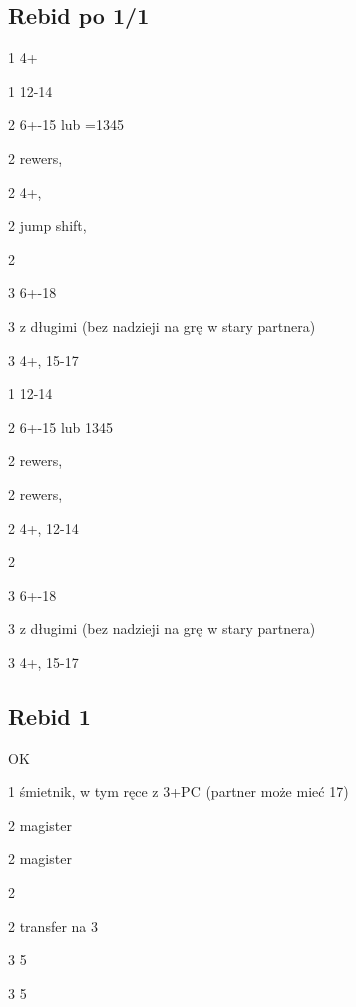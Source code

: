 \documentclass[12pt, a4paper]{article}
\begin{document}
\subsection*{Rebid po 1/1}

\sequence{{1\clubs}{1\hearts}}
\begin{options}[1]
    \item[1\spades] 4+\spades \nf
    \item[1\nt] 12-14 \bal
    \item[2\clubs] 6+-15 lub =1345 
    \item[2\diams] rewers, \fonce
    \item[2\hearts] 4+\hearts, \nf
    \item[2\spades] jump shift, \gf
    \item[2\nt] \gf
    \item[3\clubs] 6+-18 
    \item[3\diams] \gf z długimi \clubs (bez nadzieji na grę w stary partnera)  \vimp
    \item[3\hearts] 4+\hearts, 15-17 
\end{options}

\sequence{{1\clubs}{1\spades}}
\begin{options}[1]
    \item[1\nt] 12-14 \bal
    \item[2\clubs] 6+-15 lub 1345\clubs 
    \item[2\diams] rewers, \fonce
    \item[2\hearts] rewers, \fonce
    \item[2\spades] 4+\spades, 12-14
    \item[2\nt] \gf
    \item[3\clubs] 6+-18 
    \item[3\diams] \gf z długimi \clubs (bez nadzieji na grę w stary partnera) \vimp
    \item[3\spades] 4+\spades, 15-17 
\end{options}

\pagebreak
\subsection*{Rebid 1\spades}
\sequence{{1\clubs}{1\hearts}{1\spades}}
\begin{options}[2]
    \item[\pass] OK
    \item[1\nt] śmietnik, w tym ręce z 3+PC (partner może mieć 17)
    \item[2\clubs] magister
    \item[2\diams] magister
    \item[2\hearts] \soff
    \item[2\nt] transfer na 3\clubs \vimp
    \item[3\clubs] 5\clubs\ \gf \imp
    \item[3\diams] 5\diams\ \gf \imp
\end{options}
\end{document}
